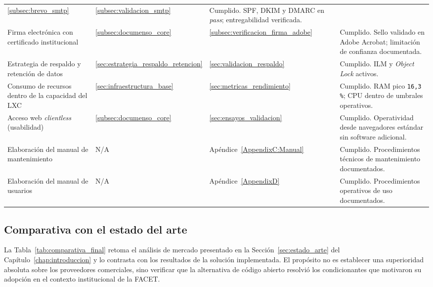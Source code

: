 \begin{longtable}{p{3.8cm} p{1.6cm} p{1.6cm} p{5.2cm}}
    \ref{subsec:brevo_smtp} &
    \ref{subsec:validacion_smtp} &
    Cumplido. SPF, DKIM y DMARC en \textit{pass}; entregabilidad verificada. \\
    \addlinespace
    Firma electrónica con certificado institucional &
    \ref{subsec:documenso_core} &
    \ref{subsec:verificacion_firma_adobe} &
    Cumplido. Sello validado en Adobe Acrobat; limitación de confianza documentada. \\
    \addlinespace
    Estrategia de respaldo y retención de datos &
    \ref{sec:estrategia_respaldo_retencion} &
    \ref{sec:validacion_respaldo} &
    Cumplido. ILM y \textit{Object Lock} activos. \\
    \addlinespace
    Consumo de recursos dentro de la capacidad del LXC &
    \ref{sec:infraestructura_base} &
    \ref{sec:metricas_rendimiento} &
    Cumplido. RAM pico \texttt{16,3\,\%}; CPU dentro de umbrales operativos. \\
    \addlinespace
    Acceso web \textit{clientless} (usabilidad) &
    \ref{subsec:documenso_core} &
    \ref{sec:ensayos_validacion} &
    Cumplido. Operatividad desde navegadores estándar sin software adicional. \\
    \addlinespace
    Elaboración del manual de mantenimiento &
    N/A &
    Apéndice~\ref{AppendixC:Manual} &
    Cumplido. Procedimientos técnicos de mantenimiento documentados. \\
    \addlinespace
    Elaboración del manual de usuarios &
    N/A &
    Apéndice~\ref{AppendixD} &
    Cumplido. Procedimientos operativos de uso documentados. \\
\end{longtable}
\normalsize

\FloatBarrier

\subsection{Comparativa con el estado del arte}
\label{subsec:comparativa_estado_arte}

La Tabla~\ref{tab:comparativa_final} retoma el análisis de mercado presentado en la
Sección~\ref{sec:estado_arte} del Capítulo~\ref{chap:introduccion} y lo contrasta
con los resultados de la solución implementada. El propósito no es establecer una
superioridad absoluta sobre los proveedores comerciales, sino verificar que la
alternativa de código abierto resolvió los condicionantes que motivaron su adopción
en el contexto institucional de la FACET.

